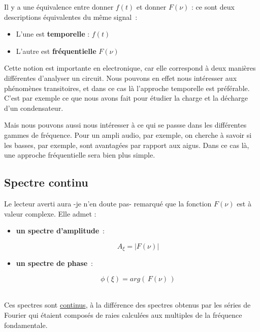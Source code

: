 Il y a une équivalence entre donner $f(t)$ et donner $F(\nu)$ : ce sont deux descriptions équivalentes du même signal~:\\

\begin{itemize}

	\item L'une est \textbf{temporelle} : $f(t)$ \\

	\item L'autre est \textbf{fréquentielle} $F(\nu)$ \\

\end{itemize}

Cette notion est importante en electronique, car elle correspond à deux manières différentes d'analyser un circuit. Nous pouvons en effet nous intéresser aux phénomènes transitoires, et dans ce cas là l'approche temporelle est préférable. C'est par exemple ce que nous avons fait pour étudier la charge et la décharge d'un condensateur.

Mais nous pouvons aussi nous intéresser à ce qui se passse dans les différentes gammes de fréquence. Pour un ampli audio, par exemple, on cherche à savoir si les basses, par exemple, sont avantagées par rapport aux aigus. Dans ce cas là, une approche fréquentielle sera bien plus simple.

\subsection*{Spectre continu}

Le lecteur averti aura -je n'en doute pas- remarqué que la fonction $F(\nu)$ est à valeur complexe. Elle admet : \\

\begin{itemize}
	\item \textbf{un spectre d'amplitude}~:  

		$$A_\xi = \lvert F(\nu) \rvert $$ 

	\item \textbf{un spectre de phase}~: 

		$$\phi(\xi) = arg(\,F(\nu)\,)$$ \\

\end{itemize}

Ces spectres sont \underline{continus}, à la différence des spectres obtenus par les séries de Fourier qui étaient composés de raies calculées aux multiples de la fréquence fondamentale.

